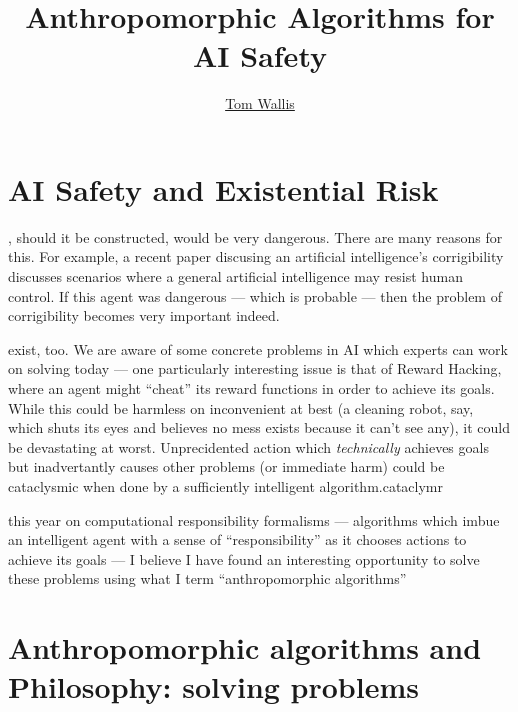 
\title{Anthropomorphic Algorithms for AI Safety}
\author[Tom Wallis]{\href{http://tom.coffee}{Tom Wallis}}
\date{}



\maketitle

\section{AI Safety and Existential Risk}

, should it be constructed, would be very dangerous. There are many reasons for this. For example, a recent paper discusing an artificial intelligence's corrigibility\cite{corrigability} discusses scenarios where a general artificial intelligence may resist human control. If this agent was dangerous --- which is probable --- then the problem of corrigibility becomes very important indeed.\par

 exist, too. We are aware of some concrete problems in AI which experts can work on solving today\cite{concrete_problems} --- one particularly interesting issue is that of Reward Hacking, where an agent might ``cheat'' its reward functions in order to achieve its goals. While this could be harmless on inconvenient at best (a cleaning robot, say, which shuts its eyes and believes no mess exists because it can't see any), it could be devastating at worst. Unprecidented action which \emph{technically} achieves goals but inadvertantly causes other problems (or immediate harm) could be cataclysmic when done by a sufficiently intelligent algorithm.cataclymr

 this year on computational responsibility formalisms --- algorithms which imbue an intelligent agent with a sense of ``responsibility'' as it chooses actions to achieve its goals --- I believe I have found an interesting opportunity to solve these problems using what I term ``anthropomorphic algorithms''

\section{Anthropomorphic algorithms and Philosophy: solving problems}

